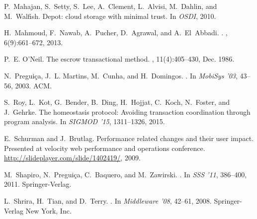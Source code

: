 \documentclass[11pt,dvipdfm]{article}
\begin{document}
\begin{thebibliography}{10}
\begin{small}
P.~Mahajan, S.~Setty, S.~Lee, A.~Clement, L.~Alvisi, M.~Dahlin, and M.~Walfish.
\newblock Depot: cloud storage with minimal trust.
\newblock In {\em OSDI}, 2010.

H.~Mahmoud, F.~Nawab, A.~Pucher, D.~Agrawal, and A.~El~Abbadi.
.
, 6(9):661--672, 2013.

P.~E. O'Neil.
\newblock The escrow transactional method.
, 11(4):405--430, Dec. 1986.

N.~Pregui\c{c}a, J.~L. Martins, M.~Cunha, and H.~Domingos.
.
\newblock In {\em MobiSys '03}, 43--56, 2003. ACM.

S.~Roy, L.~Kot, G.~Bender, B.~Ding, H.~Hojjat, C.~Koch, N.~Foster, and
  J.~Gehrke.
\newblock The homeostasis protocol: Avoiding transaction coordination through
  program analysis.
\newblock In {\em SIGMOD '15}, 1311--1326, 2015.

E.~Schurman and J.~Brutlag.
\newblock Performance related changes and their user impact. {P}resented at
  velocity web performance and operations conference.
\newblock \url{http://slideplayer.com/slide/1402419/}, 2009.

M.~Shapiro, N.~Pregui\c{c}a, C.~Baquero, and M.~Zawirski.
.
\newblock In {\em SSS '11}, 386--400, 2011. Springer-Verlag.


L.~Shrira, H.~Tian, and D.~Terry.
.
\newblock In {\em Middleware '08}, 42--61, 2008. Springer-Verlag New
  York, Inc.


\end{small}
\end{thebibliography}
\end{document}

